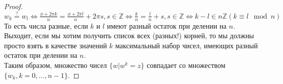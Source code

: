 \begin{normalsize}
\begin{proof}
    $w_k \stackrel{?}{=} w_l \Leftrightarrow \frac{\phi + 2\pi k}{n} = \frac{\phi + 2\pi l}{n} + 2\pi s, s\in\mathbb{Z} \Leftrightarrow \frac{k}{n} = \frac{l}{n} + s, s\in\mathbb{Z} \Leftrightarrow k-l \in n\mathbb{Z} (k \equiv l \mod n)$ \\ 

    То есть числа разные, если $k$ и $l$ имеют разный остаток при делении на $n$. Выходит, если мы хотим получить список всех (разных!) корней, то мы должны просто взять в качестве значений $k$ максимальный набор чисел, имеющих разный остаток при делении на $n$. \\

    Таким образом, множество чисел $\{ w | w^k = z\}$ совпадает со множеством $\{ w_k, k=0, \dots, n-1 \}.$
  \end{proof}
\end{normalsize}